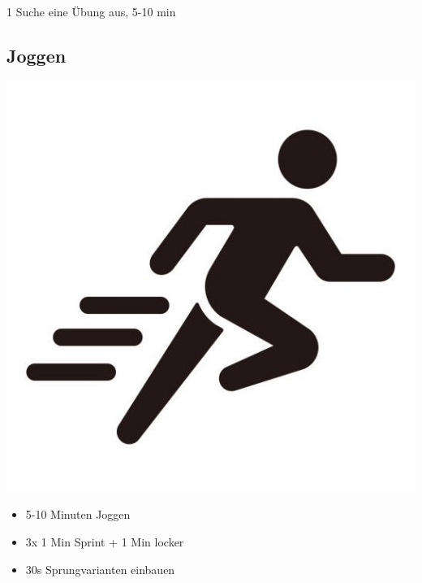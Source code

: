 1 Suche eine Übung aus, 5-10 min 

    \subsection{Joggen}
    \begin{minipage}{0.34\linewidth}
        \includegraphics[width = \linewidth]{src/1_kreislauf/images/joggen_piktogramm.jpg}
    \end{minipage}
    \begin{minipage}{0.64\linewidth}
        \begin{itemize}
            \item 5-10 Minuten Joggen
            \item 3x 1 Min Sprint + 1 Min locker
            \item 30s Sprungvarianten einbauen
        \end{itemize}
    \end{minipage}

